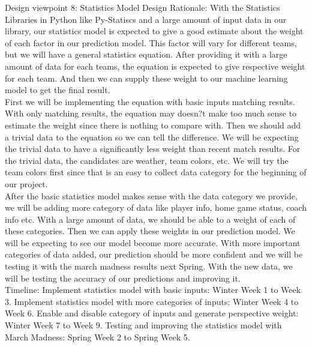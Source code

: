 \documentclass[journal,onecolumn]{IEEEtran}
\begin{document}
{\large Design viewpoint 8: Statistics Model}
{\large Design Rationale:}
With the Statistics Libraries in Python like Py-Statiscs and a large amount of input data in our library, our statistics model is expected to give a good estimate about the weight of each factor in our prediction model. This factor will vary for different teams, but we will have a general statistics equation. After providing it with a large amount of data for each teams, the equation is expected to give respective weight for each team. And then we can supply these weight to our machine learning model to get the final result.\\
First we will be implementing the equation with basic inputs matching results. With only matching results, the equation may doesn?t make too much sense to estimate the weight since there is nothing to compare with. Then we should add a trivial data to the equation so we can tell the difference. We will be expecting the trivial data to have a significantly less weight than recent match results. For the trivial data, the candidates are weather, team colors, etc. We will try the team colors first since that is an easy to collect data category for the beginning of our project. \\
After the basic statistics model makes sense with the data category we provide, we will be adding more category of data like player info, home game status, coach info etc. With a large amount of data, we should be able to a weight of each of these categories. Then we can apply these weights in our prediction model. We will be expecting to see our model become more accurate. With more important categories of data added, our prediction should be more confident and we will be testing it with the march madness results next Spring. With the new data, we will be testing the accuracy of our predictions and improving it. \\
Timeline: Implement statistics model with basic inputs: Winter Week 1 to Week 3. Implement statistics model with more categories of inputs: Winter Week 4 to Week 6. Enable and disable category of inputs and generate perspective weight: Winter Week 7 to Week 9. Testing and improving the statistics model with March Madness: Spring Week 2 to Spring Week 5.\\
\end{document}

